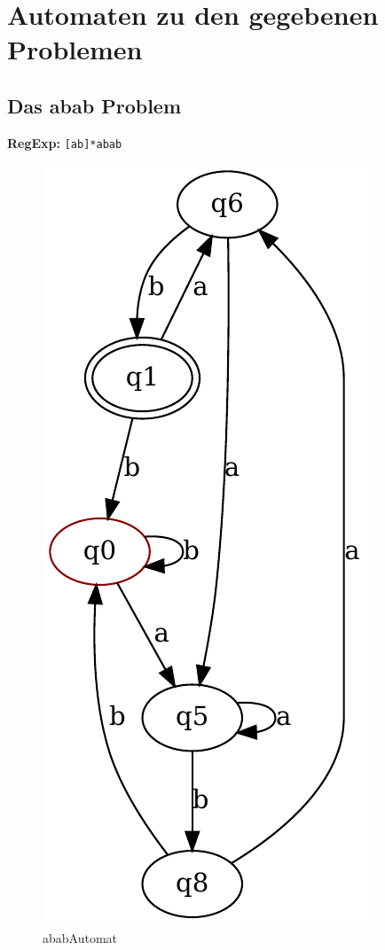 \section{Automaten zu den gegebenen Problemen}
\subsection{Das abab Problem}
\textbf{RegExp:} \lstinline$[ab]*abab$
\begin{figure}[H]
  \centering
  \includegraphics{images/abab_automat.pdf}
  \caption[\flqq abab\frqq Automat]{\flqq abab\frqq Automat}
  \label{fig:abab_automat}
\end{figure}

